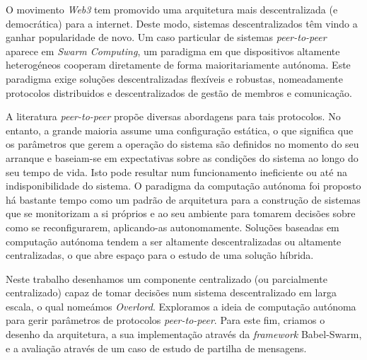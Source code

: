 
%

\par O movimento \textit{Web3} tem promovido uma arquitetura mais descentralizada (e democrática) para a internet. Deste modo, sistemas descentralizados têm vindo a ganhar popularidade de novo. Um caso particular de sistemas \textit{peer-to-peer} aparece em \textit{Swarm Computing}, um paradigma em que dispositivos altamente heterogéneos cooperam diretamente de forma maioritariamente autónoma. Este paradigma exige soluções descentralizadas flexíveis e robustas, nomeadamente protocolos distribuidos e descentralizados de gestão de membros e comunicação.
\par A literatura \textit{peer-to-peer} propõe diversas abordagens para tais protocolos. No entanto, a grande maioria assume uma configuração estática, o que significa que os parâmetros que gerem a operação do sistema são definidos no momento do seu arranque e baseiam-se em expectativas sobre as condições do sistema ao longo do seu tempo de vida. Isto pode resultar num funcionamento ineficiente ou até na indisponibilidade do sistema. O paradigma da computação autónoma foi proposto há bastante tempo como um padrão de arquitetura para a construção de sistemas que se monitorizam a si próprios e ao seu ambiente para tomarem decisões sobre como se reconfigurarem, aplicando-as autonomamente. Soluções baseadas em computação autónoma tendem a ser altamente descentralizadas ou altamente centralizadas, o que abre espaço para o estudo de uma solução híbrida.
\par Neste trabalho desenhamos um componente centralizado (ou parcialmente centralizado) capaz de tomar decisões num sistema descentralizado em larga escala, o qual nomeámos \textit{Overlord}. Exploramos a ideia de computação autónoma para gerir parâmetros de protocolos \textit{peer-to-peer}. Para este fim, criamos o desenho da arquitetura, a sua implementação através da \textit{framework} Babel-Swarm, e a avaliação através de um caso de estudo de partilha de mensagens.

